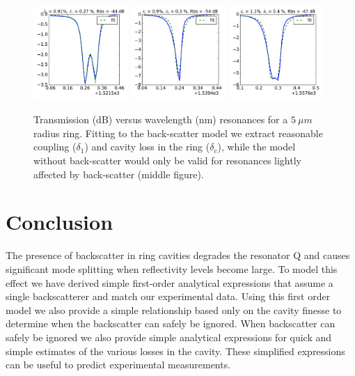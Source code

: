 \documentclass[10pt]{article}
\begin{document}
\begin{figure}[htbp]
\includegraphics[width=0.32\textwidth]{figures/bs1521.pdf}
\includegraphics[width=0.32\textwidth]{figures/bs1539.pdf}
\includegraphics[width=0.32\textwidth]{figures/bs1557.pdf}

\caption{Transmission (dB) versus wavelength (nm) resonances for a $5~\mu m$ radius ring.
Fitting to the back-scatter model  we extract reasonable coupling ($\delta_1$) and cavity loss in the ring ($\delta_c$), while the model without back-scatter would only be valid for resonances lightly affected by back-scatter (middle figure).}
\label{fig:bs_measurements}
\end{figure}


\section{Conclusion}
The presence of backscatter in ring cavities degrades the resonator Q and causes significant mode splitting when reflectivity levels become large.
To model this effect we have derived simple first-order analytical expressions that assume a single backscatterer and match our experimental data.
Using this first order model we also provide a simple relationship based only on the cavity finesse to determine when the backscatter can safely be ignored.
When backscatter can safely be  ignored we also provide simple analytical expressions for quick and simple estimates of the various losses in the cavity.
These simplified expressions can be useful to predict experimental measurements.  
\end{document}
